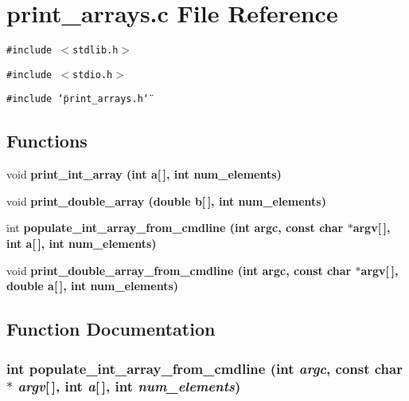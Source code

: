 \section{print\_\-arrays.c File Reference}
\label{print__arrays_8c}
{\tt \#include $<$stdlib.h$>$}\par
{\tt \#include $<$stdio.h$>$}\par
{\tt \#include \char`\"{}print\_\-arrays.h\char`\"{}}\par
\subsection*{Functions}
\begin{CompactItemize}
\item 
void \bf{print\_\-int\_\-array} (int a[$\,$], int num\_\-elements)
\item 
void \bf{print\_\-double\_\-array} (double b[$\,$], int num\_\-elements)
\item 
int \bf{populate\_\-int\_\-array\_\-from\_\-cmdline} (int argc, const char $\ast$argv[$\,$], int a[$\,$], int num\_\-elements)
\item 
void \bf{print\_\-double\_\-array\_\-from\_\-cmdline} (int argc, const char $\ast$argv[$\,$], double a[$\,$], int num\_\-elements)
\end{CompactItemize}


\subsection{Function Documentation}
\subsubsection{\setlength{\rightskip}{0pt plus 5cm}int populate\_\-int\_\-array\_\-from\_\-cmdline (int {\em argc}, const char $\ast$ {\em argv}[$\,$], int {\em a}[$\,$], int {\em num\_\-elements})}\label{print__arrays_8c_a69307fe35d8a1fdd0a109f7847bb45d}


